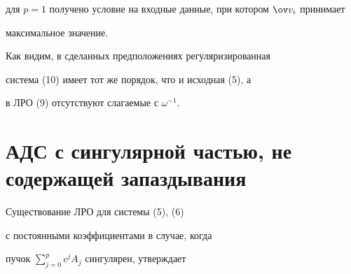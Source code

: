 для $p=1$ получено условие на входные данные, при котором $\ov v_i$ принимает


максимальное значение.





Как видим, в сделанных предположениях регуляризированная


система (10) имеет тот же порядок, что и исходная (5), а


в ЛРО (9) отсутствуют слагаемые с $\omega^{-1}$.





\section{АДС с сингулярной частью, не содержащей запаздывания}





Существование ЛРО для системы (5), (6) 


с постоянными коэффициентами в случае, когда


пучок $\sum\limits_{j=0}^{p}{c^j A_j} $ сингулярен, утверждает





